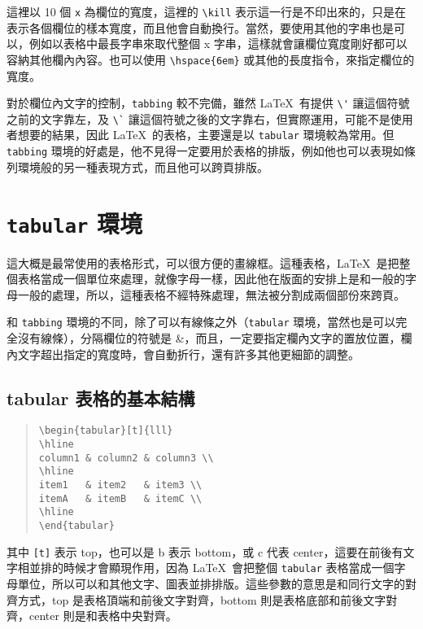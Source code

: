 這裡以 10 個 \texttt{x} 為欄位的寬度，這裡的 \verb|\kill| 表示這一行是不印出來的，只是在表示各個欄位的樣本寬度，而且他會自動換行。當然，要使用其他的字串也是可以，例如以表格中最長字串來取代整個 {\ttfamily x} 字串，這樣就會讓欄位寬度剛好都可以容納其他欄內內容。也可以使用 \verb|\hspace{6em}| 或其他的長度指令，來指定欄位的寬度。

對於欄位內文字的控制，\texttt{tabbing} 較不完備，雖然 \LaTeX\ 有提供 \verb|\'| 讓這個符號之前的文字靠左，及 \verb|\`| 讓這個符號之後的文字靠右，但實際運用，可能不是使用者想要的結果，因此 \LaTeX\ 的表格，主要還是以 \texttt{tabular} 環境較為常用。但 \texttt{tabbing} 環境的好處是，他不見得一定要用於表格的排版，例如他也可以表現如條列環境般的另一種表現方式，而且他可以跨頁排版。

\section{\texttt{tabular} 環境}
\label{sec:tabular}

這大概是最常使用的表格形式，可以很方便的畫線框。這種表格，\LaTeX\ 是把整個表格當成一個單位來處理，就像字母一樣，因此他在版面的安排上是和一般的字母一般的處理，所以，這種表格不經特殊處理，無法被分割成兩個部份來跨頁。

和 \texttt{tabbing} 環境的不同，除了可以有線條之外（\texttt{tabular} 環境，當然也是可以完全沒有線條），分隔欄位的符號是 {\ttfamily \&}，而且，一定要指定欄內文字的置放位置，欄內文字超出指定的寬度時，會自動折行，還有許多其他更細節的調整。

\subsection{{\ttfamily tabular} 表格的基本結構}

\begin{quote}
  \begin{verbatim}
\begin{tabular}[t]{lll}
\hline
column1 & column2 & column3 \\
\hline
item1   & item2   & item3 \\
itemA   & itemB   & itemC \\
\hline
\end{tabular}
\end{verbatim}
\end{quote}

其中 \verb|[t]| 表示 top，也可以是 {\ttfamily b} 表示 bottom，或 {\ttfamily c} 代表 center，這要在前後有文字相並排的時候才會顯現作用，因為 \LaTeX\ 會把整個 \texttt{tabular} 表格當成一個字母單位，所以可以和其他文字、圖表並排排版。這些參數的意思是和同行文字的對齊方式，top 是表格頂端和前後文字對齊，bottom 則是表格底部和前後文字對齊，center 則是和表格中央對齊。

